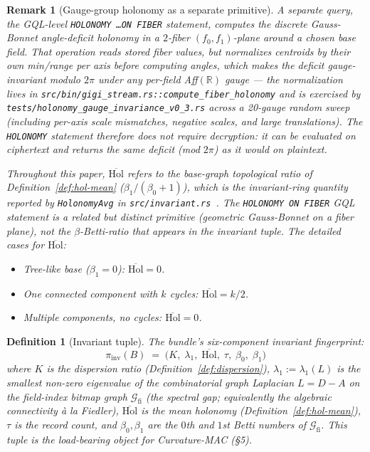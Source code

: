 \documentclass[11pt,letterpaper]{article}
\newtheorem{definition}[theorem]{Definition}
\newtheorem{remark}[theorem]{Remark}
\begin{document}
\begin{remark}[Gauge-group holonomy as a separate primitive]
A separate query, the GQL-level \texttt{HOLONOMY \ldots ON FIBER}
statement, computes the discrete Gauss-Bonnet angle-deficit
holonomy in a $2$-fiber $(f_0, f_1)$-plane around a chosen base
field. That operation reads stored fiber values, but normalizes
centroids by their own min/range per axis before computing angles,
which makes the deficit gauge-invariant modulo $2\pi$ under any
per-field Aff$(\mathbb{R})$ gauge --- the normalization lives in
\texttt{src/bin/gigi\_stream.rs::compute\_fiber\_holonomy} and is
exercised by \texttt{tests/holonomy\_gauge\_invariance\_v0\_3.rs}
across a 20-gauge random sweep (including per-axis scale
mismatches, negative scales, and large translations). The
\texttt{HOLONOMY} statement therefore does not require decryption:
it can be evaluated on ciphertext and returns the same deficit
(mod $2\pi$) as it would on plaintext.

Throughout this paper, $\overline{\mathrm{Hol}}$ refers to the
base-graph topological ratio of
Definition~\ref{def:hol-mean} ($\beta_1 / (\beta_0 + 1)$), which is
the invariant-ring quantity reported by
\texttt{HolonomyAvg} in
\texttt{src/invariant.rs}~\cite{gigi2026code}. The \texttt{HOLONOMY
ON FIBER} GQL statement is a related but distinct primitive
(geometric Gauss-Bonnet on a fiber plane), not the
$\beta$-Betti-ratio that appears in the invariant tuple. The
detailed cases for $\overline{\mathrm{Hol}}$:
\begin{itemize}[nosep]
\item Tree-like base ($\beta_1 = 0$): $\overline{\mathrm{Hol}} = 0$.
\item One connected component with $k$ cycles:
  $\overline{\mathrm{Hol}} = k/2$.
\item Multiple components, no cycles: $\overline{\mathrm{Hol}} = 0$.
\end{itemize}
\end{remark}

\begin{definition}[Invariant tuple]
\label{def:invariant-tuple}
The bundle's six-component invariant fingerprint:
\[
\pi_{\mathrm{inv}}(B) \;=\;
\bigl( K,\; \lambda_1,\; \overline{\mathrm{Hol}},\; \tau,\; \beta_0,\; \beta_1 \bigr)
\]
where $K$ is the dispersion ratio (Definition~\ref{def:dispersion}),
$\lambda_1 := \lambda_1(L)$ is the smallest non-zero eigenvalue of
the combinatorial graph Laplacian $L = D - A$ on the field-index
bitmap graph $\mathcal{G}_{\mathrm{fi}}$ (the spectral gap;
equivalently the algebraic connectivity à la Fiedler),
$\overline{\mathrm{Hol}}$ is the mean holonomy
(Definition~\ref{def:hol-mean}), $\tau$ is the record count,
and $\beta_0, \beta_1$ are the $0$th and $1$st Betti numbers of
$\mathcal{G}_{\mathrm{fi}}$. This tuple is the load-bearing object
for Curvature-MAC (\S 5).
\end{definition}
\end{document}
